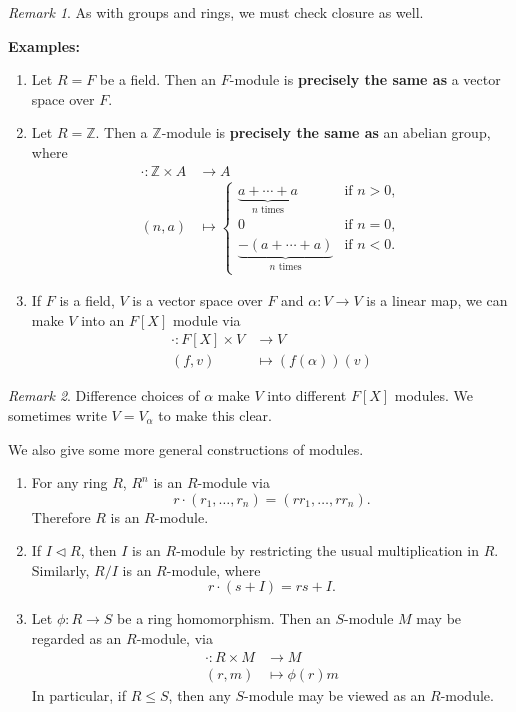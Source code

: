 \documentclass[12pt]{article}
\theoremstyle{definition}
\theoremstyle{remark}
\newtheorem*{remark}{Remark}
\begin{document}
\begin{remark}
	As with groups and rings, we must check closure as well.
\end{remark}

\textbf{Examples:} 

\begin{enumerate}[label = (\roman*)]
	\item Let $R = F$ be a field. Then an $F$-module is \textbf{precisely the same as} a vector space over $F$.
	\item Let $R = \mathbb{Z}$. Then a $\mathbb{Z}$-module is \textbf{precisely the same as} an abelian group, where
		\begin{align*}
			\cdot : \mathbb{Z} \times A &\to A \\
			(n, a) &\mapsto
			\begin{cases}
				\underbrace{a + \cdots + a}_{n \text{ times}} & \text{if } n > 0, \\
				0  &\text{if } n = 0, \\
				\underbrace{-(a + \cdots + a)}_{n \text{ times}} & \text{if } n < 0.
			\end{cases}
		\end{align*}
	\item If $F$ is a field, $V$ is a vector space over $F$ and $\alpha : V \to V$ is a linear map, we can make $V$ into an $F[X]$ module via
		\begin{align*}
			\cdot : F[X] \times V &\to V \\
			(f, v) &\mapsto (f(\alpha))(v)
		\end{align*}
\end{enumerate}
\begin{remark}
	Difference choices of $\alpha$ make $V$ into different $F[X]$ modules. We sometimes write $V = V_\alpha$ to make this clear.
\end{remark}
We also give some more general constructions of modules.

\begin{enumerate}[resume, label = (\roman*)]
	\item For any ring $R$, $R^{n}$ is an $R$-module via
		\[
			r \cdot (r_1, \ldots, r_n) = (rr_1, \ldots, rr_n)
		.\]
		Therefore $R$ is an $R$-module.
	\item If $I \lhd R$, then $I$ is an $R$-module by restricting the usual multiplication in $R$. Similarly, $R/I$ is an $R$-module, where
		\[
			r \cdot (s + I) = rs + I
		.\]
	\item Let $\phi : R \to S$ be a ring homomorphism. Then an $S$-module $M$ may be regarded as an $R$-module, via
		\begin{align*}
			\cdot : R \times M & \to M \\
			(r, m) &\mapsto \phi(r)m
		\end{align*}
		In particular, if $R \leq S$, then any $S$-module may be viewed as an $R$-module.
\end{enumerate}
\end{document}
